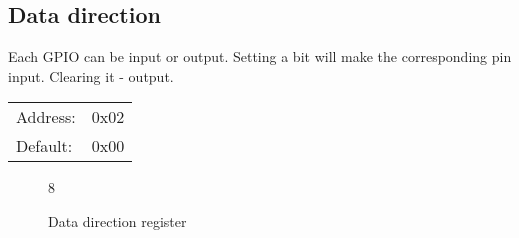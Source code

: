 \documentclass{article}
\begin{document}
	\subsection{Data direction}
	
		Each GPIO can be input or output. Setting a bit will make the corresponding pin input.
		Clearing it - output. 
	
		\begin{tabular}{ l c }
			Address: & 0x02 \\
			Default: & 0x00 \\
		\end{tabular}
		
		\begin{figure}[H]
			\centering
			\begin{bytefield}[
				bitwidth=0.1\linewidth]{8}
				 \\
			\end{bytefield}
			\caption{Data direction register}
			\label{reg:data_dir}
		\end{figure}
		
\end{document}
